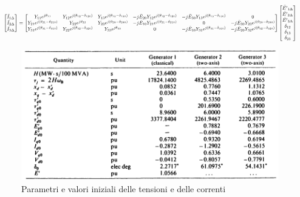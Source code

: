 \documentclass[Lau,noexaminfo]{sapthesis}
\begin{document}
	\begin{equation}
	\resizebox{\hsize}{!}{$%
		\begin{bmatrix}
		\bar{I}_{1\Delta}\\
		\bar{I}_{2\Delta}\\
		\bar{I}_{3\Delta}\\
		\end{bmatrix}=
		\begin{bmatrix}
		Y_{11}e^{j\theta_{11}} & Y_{12}e^{j(\theta_{12}-\delta_{120})} & Y_{13}e^{j(\theta_{13}-\delta_{130})} & -j\bar{E}_{20}Y_{12}e^{j(\theta_{12}-\delta_{120})} & -j\bar{E}_{30}Y_{13}e^{j(\theta_{13}-\delta_{130})} & 0\\
		Y_{21}e^{j(\theta_{21}-\delta_{210})} & Y_{22}e^{j\theta_{22}} & Y_{23}e^{j(\theta_{23}-\delta_{230})} & -j\bar{E}_{10}Y_{21}e^{j(\theta_{21}-\delta_{210})} & 0 & -j\bar{E}_{30}Y_{23}e^{j(\theta_{23}-\delta_{230})}\\
		Y_{31}e^{j(\theta_{31}-\delta_{310})} & Y_{22}e^{j(\theta_{32}-\delta_{320})} & Y_{33}e^{j\theta_{33}} & 0 & -j\bar{E}_{10}Y_{31}e^{j(\theta_{31}-\delta_{310})} & -j\bar{E}_{20}Y_{32}e^{j(\theta_{32}-\delta_{320})}\\
		\end{bmatrix}
		\begin{bmatrix}
		\bar{E'}_{1\Delta}\\
		\bar{E'}_{2\Delta}\\
		\bar{E'}_{3\Delta}\\
		\delta_{12}\\
		\delta_{13}\\
		\delta_{23}
		\end{bmatrix}
		$%
	}%
	\end{equation}
	\begin{figure}
		\centering
		\includegraphics[height=0.28\textheight]{valori_loaflow1}
		\caption{Parametri e valori iniziali delle tensioni e delle correnti}
	\end{figure}
\end{document}
